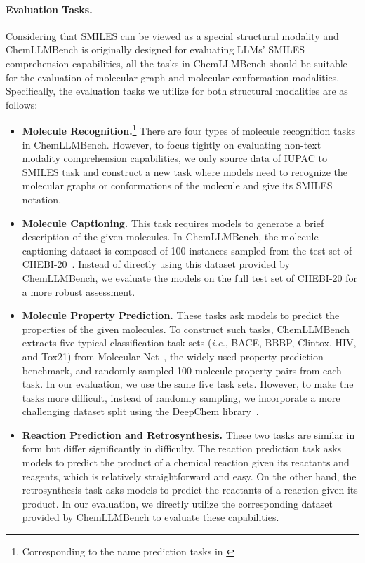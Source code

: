 \paragraph{Evaluation Tasks.} Considering that SMILES can be viewed as a special structural modality and ChemLLMBench is originally designed for evaluating LLMs' SMILES comprehension capabilities, all the tasks in ChemLLMBench should be suitable for the evaluation of molecular graph and molecular conformation modalities. Specifically, the evaluation tasks we utilize for both structural modalities are as follows:
\begin{itemize}
    \item \textbf{Molecule Recognition.}\footnote{Corresponding to the name prediction tasks in \cite{guo2023what}} There are four types of molecule recognition tasks in ChemLLMBench. However, to focus tightly on evaluating non-text modality comprehension capabilities, we only source data of IUPAC to SMILES task and construct a new task where models need to recognize the molecular graphs or conformations of the molecule and give its SMILES notation.
    \item \textbf{Molecule Captioning.} This task requires models to generate a brief description of the given molecules. In ChemLLMBench, the molecule captioning dataset is composed of 100 instances sampled from the test set of CHEBI-20~\cite{edwards-etal-2021-text2mol}. Instead of directly using this dataset provided by ChemLLMBench, we evaluate the models on the full test set of CHEBI-20 for a more robust assessment.
    \item \textbf{Molecule Property Prediction.} These tasks ask models to predict the properties of the given molecules. To construct such tasks, ChemLLMBench extracts five typical classification task sets (\textit{i.e.}, BACE, BBBP, Clintox, HIV, and Tox21) from Molecular Net~\cite{moleculenet}, the widely used property prediction benchmark, and randomly sampled 100 molecule-property pairs from each task. In our evaluation, we use the same five task sets. However, to make the tasks more difficult, instead of randomly sampling, we incorporate a more challenging dataset split using the DeepChem library~\cite{deepchem}.
    \item \textbf{Reaction Prediction and Retrosynthesis.} These two tasks are similar in form but differ significantly in difficulty. The reaction prediction task asks models to predict the product of a chemical reaction given its reactants and reagents, which is relatively straightforward and easy. On the other hand, the retrosynthesis task asks models to predict the reactants of a reaction given its product. In our evaluation, we directly utilize the corresponding dataset provided by ChemLLMBench to evaluate these capabilities.
\end{itemize}

